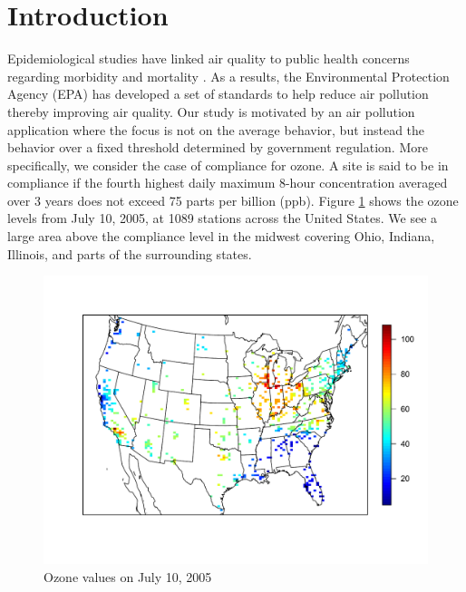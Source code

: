 \documentclass[11pt]{article}
\begin{document}
\section{Introduction}\label{s:intro}
Epidemiological studies have linked air quality to public health concerns regarding morbidity and mortality \citep{Samet2000}.
As a results, the Environmental Protection Agency (EPA) has developed a set of standards to help reduce air pollution thereby improving air quality.
Our study is motivated by an air pollution application where the focus is not on the average behavior, but instead the behavior over a fixed threshold determined by government regulation.
More specifically, we consider the case of compliance for ozone.
A site is said to be in compliance if the fourth highest daily maximum 8-hour concentration averaged over 3 years does not exceed 75 parts per billion (ppb).
Figure \ref{fig:ozone-10jul} shows the ozone levels from July 10, 2005, at 1089 stations across the United States.
We see a large area above the compliance level in the midwest covering Ohio, Indiana, Illinois, and parts of the surrounding states.
\begin{figure}
  \centering
  \includegraphics[width=\linewidth]{plots/ozone-10jul-us.pdf}
  \caption{Ozone values on July 10, 2005}
  \label{fig:ozone-10jul}
\end{figure}
\end{document}
